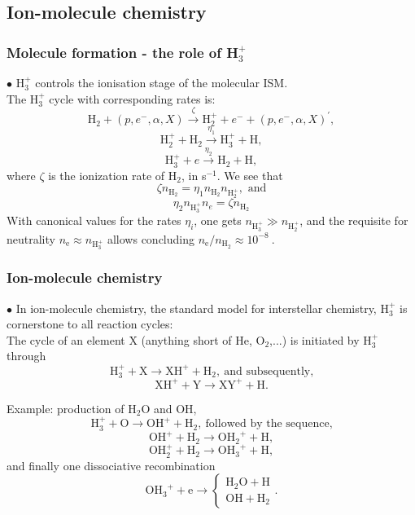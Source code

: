 \subsection{Ion-molecule chemistry}

\begin{frame}\frametitle{Molecule formation - the
role of H$_3^+$}

$\bullet$ H$_3^+$ controls the ionisation stage of the molecular ISM. \\

The  H$_3^+$  cycle with corresponding rates is:
\[ \mathrm{H}_2 + (p,e^-,\alpha,X) \stackrel{\zeta}{\rightarrow}
\mathrm{H}_2^+ + e^- +  (p,e^-,\alpha,X)^\prime, \]
\[ \mathrm{H}_2^+ +   \mathrm{H}_2 \stackrel{\eta_1} {\rightarrow} \mathrm{H}_3^+ + \mathrm{H}, \]
\[ \mathrm{H}_3^+ + e \stackrel{\eta_2}{\rightarrow}    \mathrm{H}_2 +
\mathrm{H}, \]
where $\zeta$ is the ionization rate of H$_2$, in s$^{-1}$. We see that  
\[ \zeta n_{\mathrm{H}_2} = \eta_1 n_{\mathrm{H}_2}
n_{\mathrm{H}^+_2}, \text{~and} \] 
\[ \eta_2 n_{\mathrm{H}_3^+} n_e =  \zeta n_{\mathrm{H}_2}   \] 
With canonical values for the rates $\eta_i$, one gets
$n_{\mathrm{H}_3^+} \gg n_{\mathrm{H}_2^+}$, and the requisite for
neutrality $n_\mathrm{e} \approx n_{\mathrm{H}_3^+}$ allows concluding
$n_\mathrm{e} / n_{\mathrm{H}_2} \approx 10^{-8}~$.


\end{frame} \begin{frame}\frametitle{Ion-molecule chemistry}


$\bullet$ In ion-molecule chemistry, the standard model for
interstellar chemistry, H$_3^+$ is cornerstone to all reaction cycles:
\\ 

The cycle of an element X (anything short of He, O$_2$,...)  is 
initiated  by H$_3^+$ through 
\[ \mathrm{H}_3^+ + \mathrm{X} \rightarrow \mathrm{XH^+} + \mathrm{H}_2,~
\text{and subsequently,}\]
\[ \mathrm{XH^+} + \mathrm{Y} \rightarrow \mathrm{XY}^+ + \mathrm{H}
.\]

Example: production of $\mathrm{H_2O}$ and OH, \\
\[ \mathrm{H}_3^+ + \mathrm{O} \rightarrow \mathrm{OH^+} + \mathrm{H}_2,~
\text{followed by the sequence,}\]
\[ \mathrm{OH^+} + \mathrm{H}_2 \rightarrow \mathrm{OH_2}^+ +
\mathrm{H},  \]
\[ \mathrm{OH_2^+} + \mathrm{H}_2 \rightarrow \mathrm{OH_3}^+ +
\mathrm{H}, \]
 and finally one dissociative recombination  
\[ \mathrm{OH_3}^+ + \mathrm{e} \rightarrow \left\{ \begin{array}{l}
  \mathrm{H_2O} + \mathrm{H}\\ \mathrm{OH} + \mathrm{H_2} \end{array} \right. . \]





\end{frame}
